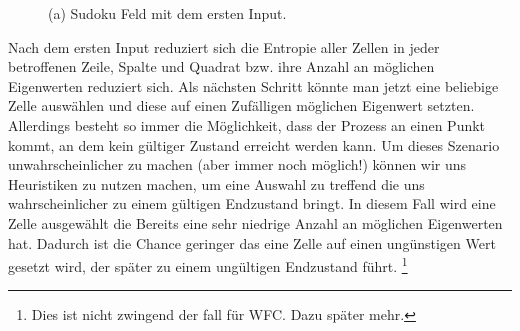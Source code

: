 \documentclass[12pt, a4paper,twoside,openright]{report} %
\begin{document}
\begin{figure}[H]
    \centering
    \caption{(a) Sudoku Feld mit dem ersten Input.}%
\end{figure}

Nach dem ersten Input reduziert sich die Entropie aller Zellen in jeder betroffenen Zeile,
Spalte und Quadrat bzw. ihre Anzahl an möglichen Eigenwerten reduziert sich.
Als nächsten Schritt könnte man jetzt eine beliebige Zelle auswählen und diese auf einen Zufälligen möglichen Eigenwert setzten.
Allerdings besteht so immer die Möglichkeit, dass der Prozess an einen Punkt kommt, an dem kein gültiger Zustand erreicht werden kann.
Um dieses Szenario unwahrscheinlicher zu machen {(aber immer noch möglich!)} können wir uns Heuristiken zu nutzen machen,
um eine Auswahl zu treffend die uns wahrscheinlicher zu einem gültigen Endzustand bringt.
In diesem Fall wird eine Zelle ausgewählt die Bereits eine sehr niedrige Anzahl an möglichen Eigenwerten hat.
Dadurch ist die Chance geringer das eine Zelle auf einen ungünstigen Wert gesetzt wird, der später zu einem ungültigen Endzustand führt.
\footnote[2]{Dies ist nicht zwingend der fall für WFC. Dazu später mehr.}
\end{document}
